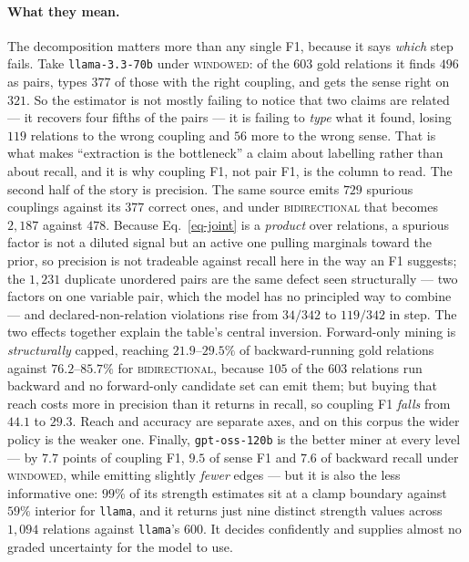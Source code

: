 \paragraph{What they mean.} The decomposition matters more than any single F1, because it says \emph{which} step
fails. Take \texttt{llama-3.3-70b} under \textsc{windowed}: of the $603$ gold relations it finds $496$ as pairs,
types $377$ of those with the right coupling, and gets the sense right on $321$. So the estimator is not mostly
failing to notice that two claims are related --- it recovers four fifths of the pairs --- it is failing to
\emph{type} what it found, losing $119$ relations to the wrong coupling and $56$ more to the wrong sense. That is
what makes ``extraction is the bottleneck'' a claim about labelling rather than about recall, and it is why
coupling F1, not pair F1, is the column to read. The second half of the story is precision. The same source emits
$729$ spurious couplings against its $377$ correct ones, and under \textsc{bidirectional} that becomes $2{,}187$
against $478$. Because Eq.~\ref{eq-joint} is a \emph{product} over relations, a spurious factor is not a diluted
signal but an active one pulling marginals toward the prior, so precision is not tradeable against recall here in
the way an F1 suggests; the $1{,}231$ duplicate unordered pairs are the same defect seen structurally --- two
factors on one variable pair, which the model has no principled way to combine --- and declared-non-relation
violations rise from $34/342$ to $119/342$ in step. The two effects together explain the table's central
inversion. Forward-only mining is \emph{structurally} capped, reaching $21.9$--$29.5\%$ of backward-running gold
relations against $76.2$--$85.7\%$ for \textsc{bidirectional}, because $105$ of the $603$ relations run backward
and no forward-only candidate set can emit them; but buying that reach costs more in precision than it returns in
recall, so coupling F1 \emph{falls} from $44.1$ to $29.3$. Reach and accuracy are separate axes, and on this
corpus the wider policy is the weaker one. Finally, \texttt{gpt-oss-120b} is the better miner at every level ---
by $7.7$ points of coupling F1, $9.5$ of sense F1 and $7.6$ of backward recall under \textsc{windowed}, while
emitting slightly \emph{fewer} edges --- but it is also the less informative one: $99\%$ of its strength
estimates sit at a clamp boundary against $59\%$ interior for \texttt{llama}, and it returns just nine distinct
strength values across $1{,}094$ relations against \texttt{llama}'s $600$. It decides confidently and supplies
almost no graded uncertainty for the model to use.

